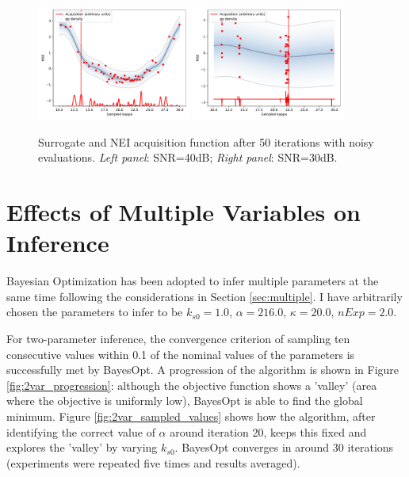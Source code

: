 \documentclass[bsc,frontabs,singlespacing,parskip,deptreport]{infthesis}
\begin{document}
\begin{figure}[htb]
    \centering
    \includegraphics[width=0.45\textwidth]{Images/Noise/acquisition_noise40.pdf}  \includegraphics[width=0.45\textwidth]{Images/Noise/acquisition_noise30.pdf} 
    \caption{Surrogate and NEI acquisition function after 50 iterations with noisy evaluations. \textit{Left panel}: SNR=40dB; \textit{Right panel}: SNR=30dB.}
    \label{fig:noise_posteriors}
\end{figure}

\section{Effects of Multiple Variables on Inference}\label{sec:results_multiple}
Bayesian Optimization has been adopted to infer multiple parameters at the same time following the considerations in Section \ref{sec:multiple}. I have arbitrarily chosen the parameters to infer to be $k_{s0} = 1.0$, $\alpha=216.0$, $\kappa=20.0$, $nExp = 2.0$.

For two-parameter inference, the convergence criterion of sampling ten consecutive values within 0.1 of the nominal values of the parameters is successfully met by BayesOpt. A progression of the algorithm is shown in Figure \ref{fig:2var_progression}: although the objective function shows a 'valley' (area where the objective is uniformly low), BayesOpt is able to find the global minimum. Figure \ref{fig:2var_sampled_values} shows how the algorithm, after identifying the correct value of $\alpha$ around iteration 20, keeps this fixed and explores the 'valley' by varying $k_{s0}$. BayesOpt converges in around 30 iterations (experiments were repeated five times and results averaged).
\end{document}
